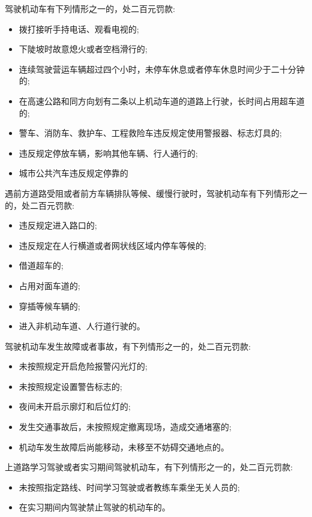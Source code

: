 \noindent 驾驶机动车有下列情形之一的，处二百元罚款:

\begin{itemize}
    \item 拨打接听手持电话、观看电视的;
    \item 下陡坡时故意熄火或者空档滑行的;
    \item 连续驾驶营运车辆超过四个小时，未停车休息或者停车休息时间少于二十分钟的;
    \item 在高速公路和同方向划有二条以上机动车道的道路上行驶，长时间占用超车道的;
    \item 警车、消防车、救护车、工程救险车违反规定使用警报器、标志灯具的;
    \item 违反规定停放车辆，影响其他车辆、行人通行的;
    \item 城市公共汽车违反规定停靠的
\end{itemize}

\noindent 遇前方道路受阻或者前方车辆排队等候、缓慢行驶时，驾驶机动车有下列情形之一的，处二百元罚款:

\begin{itemize}
    \item 违反规定进入路口的;
    \item 违反规定在人行横道或者网状线区域内停车等候的;
    \item 借道超车的;
    \item 占用对面车道的;
    \item 穿插等候车辆的;
    \item 进入非机动车道、人行道行驶的。
\end{itemize}

\noindent 驾驶机动车发生故障或者事故，有下列情形之一的，处二百元罚款:

\begin{itemize}
    \item 未按照规定开启危险报警闪光灯的;
    \item 未按照规定设置警告标志的;
    \item 夜间未开启示廓灯和后位灯的;
    \item 发生交通事故后，未按照规定撤离现场，造成交通堵塞的;
    \item 机动车发生故障后尚能移动，未移至不妨碍交通地点的。
\end{itemize}

\noindent 上道路学习驾驶或者实习期间驾驶机动车，有下列情形之一的，处二百元罚款:

\begin{itemize}
    \item 未按照指定路线、时间学习驾驶或者教练车乘坐无关人员的;
    \item 在实习期间内驾驶禁止驾驶的机动车的。
\end{itemize}

